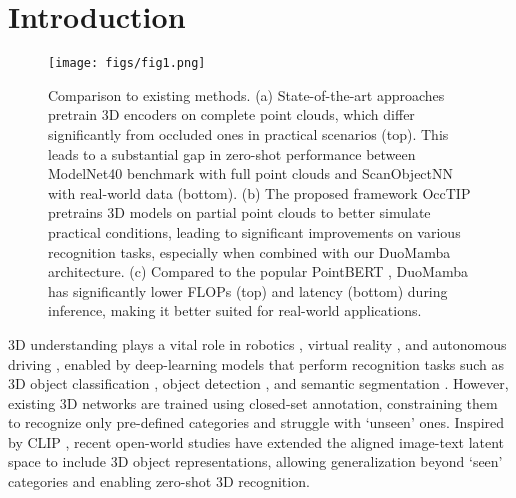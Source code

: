 \section{Introduction}
\label{sec:intro}
\begin{figure*}[!t]
    \centering
    \texttt{[image: figs/fig1.png]}
    \vspace{-9mm}
    \caption{Comparison to existing methods. (a) State-of-the-art approaches pretrain 3D encoders on complete point clouds, which differ significantly from occluded ones in practical scenarios (top). This leads to a substantial gap in zero-shot performance between ModelNet40 \cite{modelnet40} benchmark with full point clouds and ScanObjectNN \cite{scanobjectnn} with real-world data (bottom). (b) The proposed framework OccTIP pretrains 3D models on partial point clouds to better simulate practical conditions, leading to significant improvements on various recognition tasks, especially when combined with our DuoMamba architecture. (c) Compared to the popular PointBERT \cite{pointbert}, DuoMamba has significantly lower FLOPs (top) and latency (bottom) during inference, making it better suited for real-world applications.}    
    \label{fig:fig1_motivation}
    \vspace{-6mm}
\end{figure*}
3D understanding plays a vital role in robotics \cite{affordance}, virtual reality \cite{semantic_parsing}, and autonomous driving \cite{vehicle_detection}, enabled by deep-learning models that perform recognition tasks such as 3D object classification \cite{pointnet}, object detection \cite{3detr,votenet}, and semantic segmentation \cite{octree_cnn,swan}. However, existing 3D networks \cite{pointnet,pointnet++,3detr,dgcnn,point_trans_v3} are trained using closed-set annotation, constraining them to recognize only pre-defined categories and struggle with `unseen' ones. Inspired by CLIP \cite{2dclip}, recent open-world studies \cite{clip2point,pointclip,pointclipv2,openshape,uni3d,ulip} have extended the aligned image-text latent space to include 3D object representations, allowing generalization beyond `seen' categories and enabling zero-shot 3D recognition.

